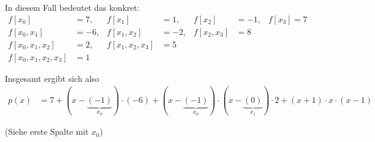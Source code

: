 In diesem Fall bedeutet das konkret:
\begin{align}
	f[x_0] &= 7,           &f[x_1] &= 1,       & f[x_2] &= -1,     & f[x_3] = 7\\
	f[x_0, x_1] &= -6,     &f[x_1, x_2] &= -2, &f[x_2, x_3] &= 8\\
	f[x_0, x_1, x_2] &= 2, &f[x_1, x_2, x_3] &= 5\\
	f[x_0, x_1, x_2, x_3] &= 1
\end{align}

Insgesamt ergibt sich also
\begin{align}
	p(x) &= 7 + (x-\underbrace{(-1)}_{x_0}) \cdot (-6) + (x-\underbrace{(-1)}_{x_0}) \cdot (x-\underbrace{(0)}_{x_1}) \cdot 2 + (x+1) \cdot x \cdot (x-1)
\end{align}

(Siehe erste Spalte mit $x_0$)
